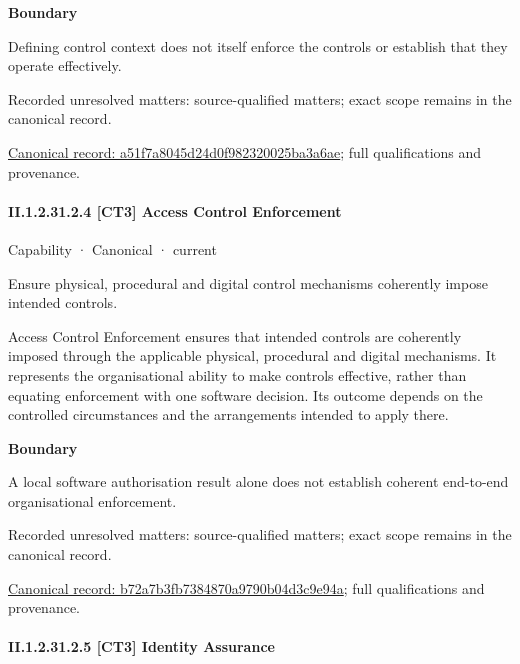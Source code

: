 \textbf{Boundary}



Defining control context does not itself enforce the controls or establish that they operate effectively.


{\small Recorded unresolved matters: source-qualified matters; exact scope remains in the canonical record.}\par
{\footnotesize \href{../../../../continuum/strategy/capability/a51f7a8045d24d0f982320025ba3a6ae.md}{Canonical record: a51f7a8045d24d0f982320025ba3a6ae}; full qualifications and provenance.}\par
\paragraph*{II.1.2.31.2.4 [CT3] Access Control Enforcement}
\label{navigation:II.1.2.31.2.4}

\label{element:b72a7b3fb7384870a9790b04d3c9e94a}
{\small Capability · Canonical · current}\par

Ensure physical, procedural and digital control mechanisms coherently impose intended controls.



Access Control Enforcement ensures that intended controls are coherently imposed through the applicable physical, procedural and digital mechanisms. It represents the organisational ability to make controls effective, rather than equating enforcement with one software decision. Its outcome depends on the controlled circumstances and the arrangements intended to apply there.



\textbf{Boundary}



A local software authorisation result alone does not establish coherent end-to-end organisational enforcement.


{\small Recorded unresolved matters: source-qualified matters; exact scope remains in the canonical record.}\par
{\footnotesize \href{../../../../continuum/strategy/capability/b72a7b3fb7384870a9790b04d3c9e94a.md}{Canonical record: b72a7b3fb7384870a9790b04d3c9e94a}; full qualifications and provenance.}\par
\paragraph*{II.1.2.31.2.5 [CT3] Identity Assurance}
\label{navigation:II.1.2.31.2.5}

